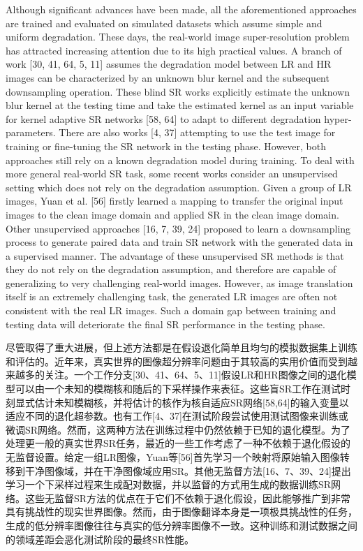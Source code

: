 Although significant advances have been made, all the aforementioned approaches are trained and evaluated on simulated datasets which assume simple and uniform degradation. These days, the real-world image super-resolution problem has attracted increasing attention due to its high practical values. A branch of work [30, 41, 64, 5, 11] assumes the degradation model between LR and HR images can be characterized by an unknown blur kernel and the subsequent downsampling operation. These blind SR works explicitly estimate the unknown blur kernel at the testing time and take the estimated kernel as an input variable for kernel adaptive SR networks [58, 64] to adapt to different degradation hyper-parameters. There are also works [4, 37] attempting to use the test image for training or fine-tuning the SR network in the testing phase. However, both approaches still rely on a known degradation model during training. To deal with more general real-world SR task, some recent works consider an unsupervised setting which does not rely on the degradation assumption. Given a group of LR images, Yuan et al. [56] firstly learned a mapping to transfer the original input images to the clean image domain and applied SR in the clean image domain. Other unsupervised approaches [16, 7, 39, 24] proposed to learn a downsampling process to generate paired data and train SR network with the generated data in a supervised manner. The advantage of these unsupervised SR methods is that they do not rely on the degradation assumption, and therefore are capable of generalizing to very challenging real-world images. However, as image translation itself is an extremely challenging task, the generated LR images are often not consistent with the real LR images. Such a domain gap between training and testing data will deteriorate the final SR performance in the testing phase.

尽管取得了重大进展，但上述方法都是在假设退化简单且均匀的模拟数据集上训练和评估的。近年来，真实世界的图像超分辨率问题由于其较高的实用价值而受到越来越多的关注。一个工作分支[30、41、64、5、11]假设LR和HR图像之间的退化模型可以由一个未知的模糊核和随后的下采样操作来表征。这些盲SR工作在测试时刻显式估计未知模糊核，并将估计的核作为核自适应SR网络[58,64]的输入变量以适应不同的退化超参数。也有工作[4、37]在测试阶段尝试使用测试图像来训练或微调SR网络。然而，这两种方法在训练过程中仍然依赖于已知的退化模型。为了处理更一般的真实世界SR任务，最近的一些工作考虑了一种不依赖于退化假设的无监督设置。给定一组LR图像，Yuan等[56]首先学习一个映射将原始输入图像转移到干净图像域，并在干净图像域应用SR。其他无监督方法[16、7、39、24]提出学习一个下采样过程来生成配对数据，并以监督的方式用生成的数据训练SR网络。这些无监督SR方法的优点在于它们不依赖于退化假设，因此能够推广到非常具有挑战性的现实世界图像。然而，由于图像翻译本身是一项极具挑战性的任务，生成的低分辨率图像往往与真实的低分辨率图像不一致。这种训练和测试数据之间的领域差距会恶化测试阶段的最终SR性能。

